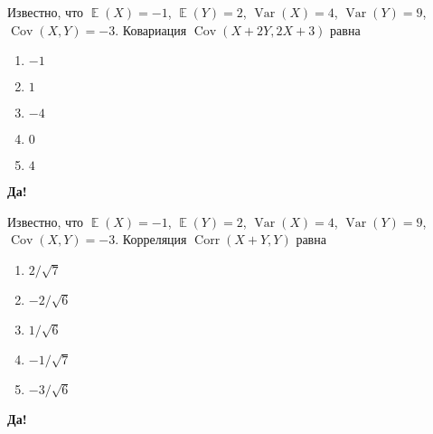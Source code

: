\documentclass[t]{beamer}
\DeclareMathOperator{\Var}{Var}
\DeclareMathOperator{\Cov}{Cov}
\DeclareMathOperator{\Corr}{Corr}
\DeclareMathOperator{\E}{\mathbb{E}}
\begin{document}
 \begin{frame} \label{20-Yes} 
\begin{block}{20} 

Известно, что $\E(X)=-1$, $\E(Y)=2$, $\Var(X)=4$, $\Var(Y)=9$, $\Cov(X,Y)=-3$. Ковариация $\Cov(X+2Y, 2X+3)$ равна


 \end{block} 
\begin{enumerate} 
\item[] \hyperlink{20-No}{\beamergotobutton{}  $-1$ }
\item[] \hyperlink{20-No}{\beamergotobutton{}  $1$ }
\item[] \hyperlink{20-Yes}{\beamergotobutton{}  $-4$ }
\item[] \hyperlink{20-No}{\beamergotobutton{}  $0$ }
\item[] \hyperlink{20-No}{\beamergotobutton{}  $4$ }
\end{enumerate} 

 \textbf{Да!} 
 \hyperlink{21}{}\end{frame} 


 \begin{frame} \label{21-Yes} 
\begin{block}{21} 

Известно, что $\E(X)=-1$, $\E(Y)=2$, $\Var(X)=4$, $\Var(Y)=9$, $\Cov(X,Y)=-3$. Корреляция $\Corr(X+Y, Y)$ равна


 \end{block} 
\begin{enumerate} 
\item[] \hyperlink{21-Yes}{\beamergotobutton{}  $2/\sqrt7$ }
\item[] \hyperlink{21-No}{\beamergotobutton{}  $-2/\sqrt6$ }
\item[] \hyperlink{21-No}{\beamergotobutton{}  $1/\sqrt6$  }
\item[] \hyperlink{21-No}{\beamergotobutton{}  $-1/\sqrt7 $ }
\item[] \hyperlink{21-No}{\beamergotobutton{}  $-3/\sqrt6$ }
\end{enumerate} 

 \textbf{Да!} 
 \hyperlink{22}{}\end{frame} 
\end{document}
